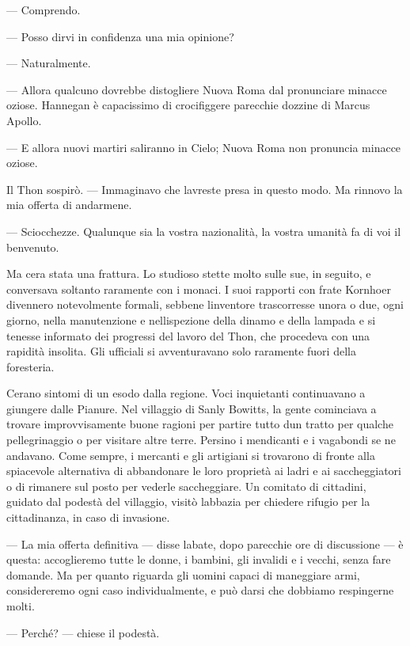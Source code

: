 --- Comprendo.

--- Posso dirvi in confidenza una mia opinione?

--- Naturalmente.

--- Allora qualcuno dovrebbe distogliere Nuova Roma dal pronunciare
minacce oziose. Hannegan è capacissimo di crocifiggere parecchie dozzine
di Marcus Apollo.

--- E allora nuovi martiri saliranno in Cielo; Nuova Roma non pronuncia
minacce oziose.

Il Thon sospirò. --- Immaginavo che l\textquotesingle avreste presa in
questo modo. Ma rinnovo la mia offerta di andarmene.

--- Sciocchezze. Qualunque sia la vostra nazionalità, la vostra umanità
fa di voi il benvenuto.

Ma c\textquotesingle era stata una frattura. Lo studioso stette molto
sulle sue, in seguito, e conversava soltanto raramente con i monaci. I
suoi rapporti con frate Kornhoer divennero notevolmente formali, sebbene
l\textquotesingle inventore trascorresse un\textquotesingle ora o due,
ogni giorno, nella manutenzione e nell\textquotesingle ispezione della
dinamo e della lampada e si tenesse informato dei progressi del lavoro
del Thon, che procedeva con una rapidità insolita. Gli ufficiali si
avventuravano solo raramente fuori della foresteria.

C\textquotesingle erano sintomi di un esodo dalla regione. Voci
inquietanti continuavano a giungere dalle Pianure. Nel villaggio di
Sanly Bowitts, la gente cominciava a trovare improvvisamente buone
ragioni per partire tutto d\textquotesingle un tratto per qualche
pellegrinaggio o per visitare altre terre. Persino i mendicanti e i
vagabondi se ne andavano. Come sempre, i mercanti e gli artigiani si
trovarono di fronte alla spiacevole alternativa di abbandonare le loro
proprietà ai ladri e ai saccheggiatori o di rimanere sul posto per
vederle saccheggiare. Un comitato di cittadini, guidato dal podestà del
villaggio, visitò l\textquotesingle abbazia per chiedere rifugio per la
cittadinanza, in caso di invasione.

--- La mia offerta definitiva --- disse l\textquotesingle abate, dopo
parecchie ore di discussione --- è questa: accoglieremo tutte le donne,
i bambini, gli invalidi e i vecchi, senza fare domande. Ma per quanto
riguarda gli uomini capaci di maneggiare armi, considereremo ogni caso
individualmente, e può darsi che dobbiamo respingerne molti.

--- Perché? --- chiese il podestà.

